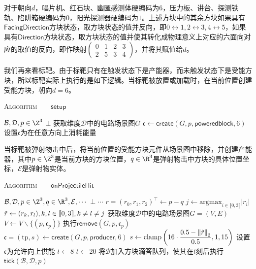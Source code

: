 \documentclass[a4,11pt]{aleph-notas}
\begin{document}
对于朝向$d$，唱片机、红石块、幽匿感测体硬编码为$6$，压力板、讲台、探测铁轨、陷阱箱硬编码为$0$，阳光探测器硬编码为$1$。上述方块中的其余方块如果具有$\mathsf{FacingDirection}$方块状态，取方块状态的值并反向，即$0\leftrightarrow1,2\leftrightarrow3,4\leftrightarrow5$，如果具有$\mathsf{Direction}$方块状态，取方块状态的值并使其转化成物理意义上对应的六面向对应的取值的反向，即作映射$\begin{pmatrix}
    0&1&2&3\\
    2&5&3&4
\end{pmatrix}$，并将其赋值给$d$。

我们再来看标靶。由于标靶只有在触发状态下是产能器，而未触发状态下是受能方块，所以标靶实际上执行的是如下逻辑。当标靶被放置或加载时，在当前位置创建受能方块，朝向$d=6$。

\begin{codigo}
\textsc{Algorithm}\ \ \ \ $\mathsf{setup}$
\begin{algorithmic}[1]
    \Require $\mathcal{B},\mathcal{D},p\in\Z^3$
    \Ensure $\bot$
    \State 获取维度$\mathcal{D}$中的电路场景图$G$
    \State $\mathfrak{c}\gets\mathsf{create}(G,p,\mathsf{poweredblock},6)$
    \State 设置$\mathfrak{c}$为在任意方向上消耗能量
    \State \Return
\end{algorithmic}
\end{codigo}

当标靶被弹射物击中后，将当前位置的受能方块元件从场景图中移除，并创建产能器，其中$p\in\Z^3$是当前方块的方块位置，$q\in\R^3$是弹射物击中方块的具体位置坐标，$\mathcal{E}$是弹射物实体。

\begin{codigo}
\textsc{Algorithm}\ \ \ \ $\mathsf{onProjectileHit}$
\begin{algorithmic}[1]
    \Require $\mathcal{B},\mathcal{D},p\in\Z^3,q\in\R^3,\mathcal{E},\cdots$
    \Ensure $\bot$
    \State $\cdots$
    \State $r=(r_0,r_1,r_2)^\top\gets p-q$
    \State $j\gets\mathrm{argmax}_{i\in\llbracket0,3\rrbracket}|r_i|$
    \State $\Tilde{r}\gets(r_k,r_l),k,l\in\llbracket0,3\rrbracket,k\ne l\ne j$
    \State 获取维度$\mathcal{D}$中的电路场景图$G=(V,E)$
    \State $V\gets V\backslash\{(p,\mathfrak{c}_p)\}$
    \State 执行$\mathsf{remove}(G,p,\mathfrak{c}_p)$
    \State $\mathfrak{c}=(\mathrm{tp},s)\gets\mathsf{create}(G,p,\mathsf{producer},6)$
    \State $s\gets\mathrm{clamp}\left(16\cdot\dfrac{0.5-\left\Vert\Tilde{r}\right\Vert_2}{0.5},1,15\right)$
    \State 设置$\mathfrak{c}$为允许向上供能
    \State $t\gets8$
        \State $t\gets20$
    \EndIf
    \State 将$\mathcal{B}$加入方块滴答队列，使其在$t$刻后执行$\mathsf{tick}(\mathcal{B},\mathcal{D},p)$
    \State \Return
\end{algorithmic}
\end{codigo}
\end{document}
